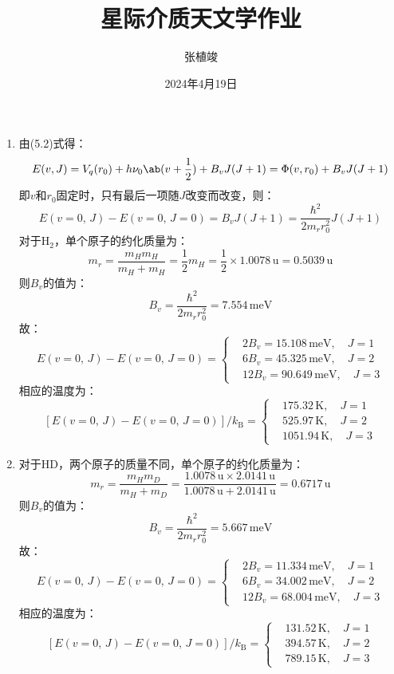 \documentclass[a4paper,fontset=none]{ctexart}
\title{\textbf{星际介质天文学作业}}
\author{张植竣}
\date{2024年4月19日}
\begin{document}
\maketitle

\begin{enumerate}
    \item[5.1 (a)]
    由(5.2)式得：
    \[
        E(v,J) = V_q(r_0) + h\nu_0\ab(v+\frac{1}{2}) + B_v J(J+1) = \Phi(v,r_0) + B_v J(J+1)
    \]
    即$v$和$r_0$固定时，只有最后一项随$J$改变而改变，则：
    \[
        E(v=0,\, J) - E(v=0,\, J=0) = B_v J(J+1) = \frac{\hbar^2}{2m_r r_0^2} J(J+1)
    \]
    对于$\mathrm{H_2}$，单个原子的约化质量为：
    \[
        m_r = \frac{m_H m_H}{m_H + m_H} = \frac{1}{2}m_H = \frac{1}{2} \times 1.0078\,\mathrm{u} = 0.5039\,\mathrm{u}
    \]
    则$B_v$的值为：
    \[
        B_v = \frac{\hbar^2}{2m_r r_0^2} = 7.554\,\mathrm{meV}
    \]
    故：
    \[
        E(v=0,\, J) - E(v=0,\, J=0) =
        \begin{cases}
            & 2B_v = 15.108\,\mathrm{meV},\quad J = 1 \\
            & 6B_v = 45.325\,\mathrm{meV},\quad J = 2 \\
            & 12B_v = 90.649\,\mathrm{meV},\quad J = 3
        \end{cases}
    \]
    相应的温度为：
    \[
        [E(v=0,\, J) - E(v=0,\, J=0)]/k_{\mathrm{B}} =
        \begin{cases}
            & 175.32\,\mathrm{K},\quad J = 1 \\
            & 525.97\,\mathrm{K},\quad J = 2 \\
            & 1051.94\,\mathrm{K},\quad J = 3
        \end{cases}
    \]

    \medskip
    \item[5.1 (b)]
    对于$\mathrm{HD}$，两个原子的质量不同，单个原子的约化质量为：
    \[
        m_r = \frac{m_H m_D}{m_H + m_D} = \frac{1.0078\,\mathrm{u} \times 2.0141\,\mathrm{u}}{1.0078\,\mathrm{u} + 2.0141\,\mathrm{u}} = 0.6717\,\mathrm{u}
    \]
    则$B_v$的值为：
    \[
        B_v = \frac{\hbar^2}{2m_r r_0^2} = 5.667\,\mathrm{meV}
    \]
    故：
    \[
        E(v=0,\, J) - E(v=0,\, J=0) =
        \begin{cases}
            & 2B_v = 11.334\,\mathrm{meV},\quad J = 1 \\
            & 6B_v = 34.002\,\mathrm{meV},\quad J = 2 \\
            & 12B_v = 68.004\,\mathrm{meV},\quad J = 3
        \end{cases}
    \]
    相应的温度为：
    \[
        [E(v=0,\, J) - E(v=0,\, J=0)]/k_{\mathrm{B}} =
        \begin{cases}
            & 131.52\,\mathrm{K},\quad J = 1 \\
            & 394.57\,\mathrm{K},\quad J = 2 \\
            & 789.15\,\mathrm{K},\quad J = 3
        \end{cases}
    \]


\end{enumerate}
\end{document}
